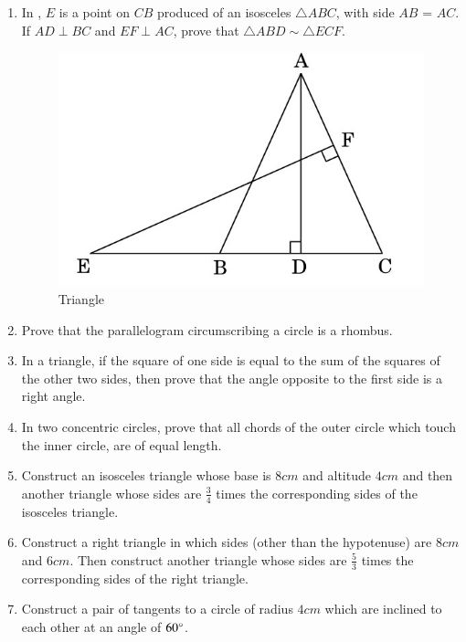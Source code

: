 \documentclass[2pt,-letter paper]{article}
\begin{document}
\begin{enumerate}
\item In , $E$ is a point on $CB$ produced of an isosceles ${\triangle ABC}$, with side $AB$ = $AC$. If ${AD \perp  BC }$ and ${ EF \perp AC}$, prove that ${\triangle ABD{ \sim }\triangle ECF}$.
 \begin{figure}[H]
    \centering
    \includegraphics[width=\columnwidth]{figures/Figure_1.png}
    \caption{Triangle}
    \label{fig:Fig-1}
\end{figure}

\item Prove that the parallelogram circumscribing a circle is a rhombus.

\item In a triangle, if the square of one side is equal to the sum of the squares of the other two sides, then prove that the angle opposite to the first side is a right angle.

\item In two concentric circles, prove that all chords of the outer circle which touch the inner circle, are of equal length.

\item Construct an isosceles triangle whose base is $8 cm$ and altitude $4 cm$ and then another triangle whose sides are $\frac{3}{4}$ times the corresponding sides of the isosceles triangle.

\item Construct a right triangle in which sides (other than the hypotenuse) are $8 cm$ and $6 cm$. Then construct another triangle whose sides are $\frac{5}{3}$ times the corresponding sides of the right triangle.

\item Construct a pair of tangents to a circle of radius $4 cm$ which are inclined to each other at an angle of $60\degree$.


\end{enumerate}
\end{document}
